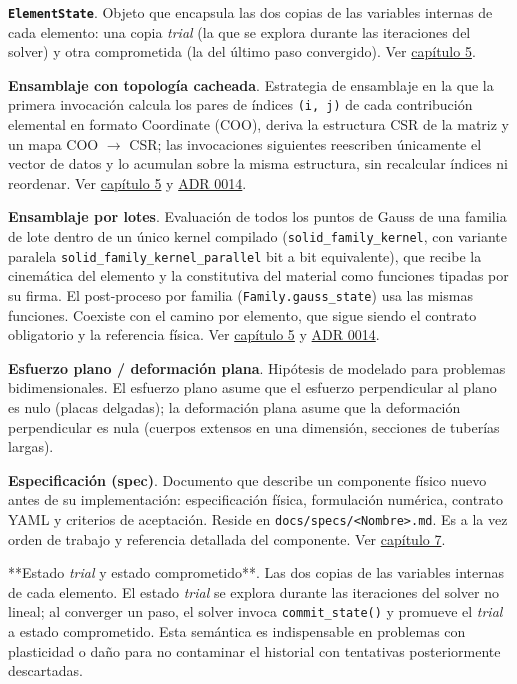 \documentclass[11pt,oneside]{report}
\begin{document}
\textbf{\texttt{ElementState}}. Objeto que encapsula las dos copias de las variables internas de cada elemento: una copia \textit{trial} (la que se explora durante las iteraciones del solver) y otra comprometida (la del último paso convergido). Ver \hyperref[cap:5]{capítulo 5}.

\textbf{Ensamblaje con topología cacheada}. Estrategia de ensamblaje en la que la primera invocación calcula los pares de índices \texttt{(i, j)} de cada contribución elemental en formato Coordinate (COO), deriva la estructura CSR de la matriz y un mapa COO \ensuremath{\to} CSR; las invocaciones siguientes reescriben únicamente el vector de datos y lo acumulan sobre la misma estructura, sin recalcular índices ni reordenar. Ver \hyperref[cap:5]{capítulo 5} y \hyperref[adr:0014]{ADR 0014}.

\textbf{Ensamblaje por lotes}. Evaluación de todos los puntos de Gauss de una familia de lote dentro de un único kernel compilado (\texttt{solid\_\allowbreak{}family\_\allowbreak{}kernel}, con variante paralela \texttt{solid\_\allowbreak{}family\_\allowbreak{}kernel\_\allowbreak{}parallel} bit a bit equivalente), que recibe la cinemática del elemento y la constitutiva del material como funciones tipadas por su firma. El post-proceso por familia (\texttt{Family.\allowbreak{}gauss\_\allowbreak{}state}) usa las mismas funciones. Coexiste con el camino por elemento, que sigue siendo el contrato obligatorio y la referencia física. Ver \hyperref[cap:5]{capítulo 5} y \hyperref[adr:0014]{ADR 0014}.

\textbf{Esfuerzo plano / deformación plana}. Hipótesis de modelado para problemas bidimensionales. El esfuerzo plano asume que el esfuerzo perpendicular al plano es nulo (placas delgadas); la deformación plana asume que la deformación perpendicular es nula (cuerpos extensos en una dimensión, secciones de tuberías largas).

\textbf{Especificación (spec)}. Documento que describe un componente físico nuevo antes de su implementación: especificación física, formulación numérica, contrato YAML y criterios de aceptación. Reside en \texttt{docs/\allowbreak{}specs/\allowbreak{}\textless{}Nombre\textgreater{}.\allowbreak{}md}. Es a la vez orden de trabajo y referencia detallada del componente. Ver \hyperref[cap:7]{capítulo 7}.

**Estado \textit{trial} y estado comprometido**. Las dos copias de las variables internas de cada elemento. El estado \textit{trial} se explora durante las iteraciones del solver no lineal; al converger un paso, el solver invoca \texttt{commit\_state()} y promueve el \textit{trial} a estado comprometido. Esta semántica es indispensable en problemas con plasticidad o daño para no contaminar el historial con tentativas posteriormente descartadas.
\end{document}
